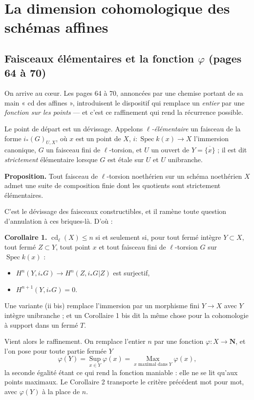 \documentclass[11pt,a4paper]{article}
\begin{document}
\section*{La dimension cohomologique des schémas affines}

\subsection*{Faisceaux élémentaires et la fonction $\varphi$ (pages 64 à 70)}

On arrive au cœur. Les pages 64 à 70, annoncées par une chemise portant de sa
main « cd des affines », introduisent le dispositif qui remplace un \emph{entier}
par une \emph{fonction sur les points} — et c'est ce raffinement qui rend la
récurrence possible.

Le point de départ est un dévissage. Appelons \emph{$\ell$-élémentaire} un
faisceau de la forme $i_{*}(G)_{U,X}$, où $x$ est un point de $X$,
$i : \operatorname{Spec} k(x) \to X$ l'immersion canonique, $G$ un faisceau fini
de $\ell$-torsion, et $U$ un ouvert de $Y = \overline{\{x\}}$ ; il est dit
\emph{strictement} élémentaire lorsque $G$ est étale sur $U$ et $U$ unibranche.

\textbf{Proposition.} Tout faisceau de $\ell$-torsion noethérien sur un schéma
noethérien $X$ admet une suite de composition finie dont les quotients sont
strictement élémentaires.

C'est le dévissage des faisceaux constructibles, et il ramène toute question
d'annulation à ces briques-là. D'où :

\textbf{Corollaire 1.} $\operatorname{cd}_{\ell}(X) \leqslant n$ si et seulement
si, pour tout fermé intègre $Y \subset X$, tout fermé $Z \subset Y$, tout point
$x$ et tout faisceau fini de $\ell$-torsion $G$ sur $\operatorname{Spec} k(x)$ :
\begin{itemize}
\item[a)] $H^n(Y, i_{*}G) \to H^n(Z, i_{*}G|Z)$ est surjectif,
\item[b)] $H^{n+1}(Y, i_{*}G) = 0$.
\end{itemize}
Une variante (ii bis) remplace l'immersion par un morphisme fini $Y \to X$ avec
$Y$ intègre unibranche ; et un Corollaire 1 bis dit la même chose pour la
cohomologie à support dans un fermé $T$.

Vient alors le raffinement. On remplace l'entier $n$ par une fonction
$\varphi : X \to \mathbf{N}$, et l'on pose pour toute partie fermée $Y$
\[
\varphi(Y) = \operatorname*{Sup}_{x \in Y} \varphi(x)
= \operatorname*{Max}_{x \text{ maximal dans } Y} \varphi(x),
\]
la seconde égalité étant ce qui rend la fonction maniable : elle ne se lit qu'aux
points maximaux. Le Corollaire 2 transporte le critère précédent mot pour mot,
avec $\varphi(Y)$ à la place de $n$.
\end{document}
